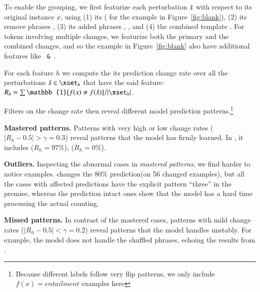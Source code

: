 To enable the grouping, we first featurize each perturbation $\hat{x}$ with respect to its original instance $x$, using 
(1) its \tagstr ( for the example in Figure~\ref{fig:blank}), 
(2) its remove phrases , 
(3) its added phrases , , and 
(4) the combined template .
For tokens involving multiple changes, we featurize both the primary and the combined changes, and so the example in Figure~\ref{fig:blank} also have additional features like \texttt{ \& }.

For each feature $h$ we compute the its prediction change rate over all the perturbations $\xp \in \xset_{h}$ that have the said feature: 
$R_h = \sum {\mathbb{1}[f(x) \not\eq f(\xp)]} / |\xset_h|$.

Filters on the change rate then reveal different model prediction patterns.\footnote{Because different \nli labels follow very flip patterns, we only include $f(x)=entailment$ examples here}

\noindent\textbf{Mastered patterns.}
Patterns with very high or low change rates (\eg $|R_h-0.5| > \gamma=0.3$) reveal patterns that the model has firmly learned.
In \nli, it includes  ($R_h=97\%$),  ($R_h=0\%$).

\noindent\textbf{Outliers.}
Inspecting the abnormal cases in \emph{mastered patterns}, we find harder to notice examples.
 changes the 80\% prediction(on 56 changed examples), but all the cases with affected predictions have the explicit pattern ``three'' in the premise, whereas the prediction intact ones show that the model has a hard time processing the actual counting.


\noindent\textbf{Missed patterns.}
In contrast of the mastered cases, patterns with mild change rates (\eg $|R_h-0.5| < \gamma=0.2$) reveal patterns that the model handles unstably.
For example, the model does not handle the shuffled phrases, echoing the results from \citet{mccoy2019right}.

